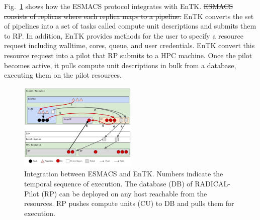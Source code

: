 Fig.~\ref{figure:ht-bac_rp} shows how the ESMACS protocol integrates with
EnTK. \st{ESMACS consists of replicas where each replica maps to a pipeline.}
EnTK converts the set of pipelines into a set of tasks called compute unit
descriptions and submits them to RP\@. In addition, EnTK provides methods for
the user to specify a resource request including walltime, cores, queue, and
user credentials. EnTK convert this resource request into a pilot that RP
submits to a HPC machine. Once the pilot becomes active, it pulls compute unit
descriptions in bulk from a database, executing them on the pilot resources.

\begin{figure}
\centering
  \includegraphics[width=0.5\textwidth]{FIGURES/ht-bac-rp_integration.pdf}
  \caption{Integration between ESMACS and EnTK\@. Numbers indicate
  the temporal sequence of execution. The database (DB) of RADICAL-Pilot (RP)
  can be deployed on any host reachable from the resources. RP pushes compute
  units (CU) to DB and pulls them for execution.}\label{figure:ht-bac_rp}
\end{figure}







